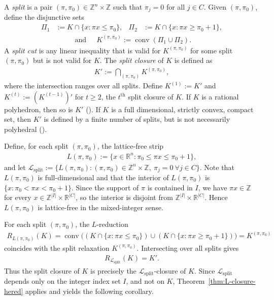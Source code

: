 \documentclass{article}
\newcommand{\Z}{\mathbb{Z}}
\newcommand{\R}{\mathbb{R}}
\renewcommand{\L}{\mathcal{L}}
\begin{document}
A \emph{split} is a pair $(\pi, \pi_0) \in \Z^n \times \Z$ such that $\pi_j = 0$ for all $j \in C$.
Given $(\pi, \pi_0)$, define the disjunctive sets
\begin{align}
    \Pi_1 &:= K \cap \{x : \pi x \leq \pi_0\}, &
    \Pi_2 &:= K \cap \{x : \pi x \geq \pi_0 + 1\}, 
\end{align}
\begin{align}
   \mbox{ and } \;\;\;\; K^{(\pi, \pi_0)} := \operatorname{conv}(\Pi_1 \cup \Pi_2).
\end{align}
A \emph{split cut} is any linear inequality that is valid for $K^{(\pi, \pi_0)}$ for some split $(\pi, \pi_0)$ but is not valid for $K$.
The \emph{split closure} of $K$ is defined as 
\begin{align}
    K' := \bigcap_{(\pi, \pi_0)} K^{(\pi, \pi_0)},
\end{align}
where the intersection ranges over all splits.
Define $K^{(1)} := K'$ and $K^{(t)} := (K^{(t-1)})'$ for $t \geq 2$, the $t^{\text{th}}$ split closure of $K$.
If $K$ is a rational polyhedron, then so is $K'$ (\cite{cook1990chvatal}). If $K$ is a full dimensional, strictly convex, compact set, then $K'$ is defined by a finite number of splits, but is not necessarily polyhedral (\cite{dadush2011split}).


Define, for each split $(\pi, \pi_0)$, the lattice-free strip
\begin{align}
    L(\pi, \pi_0) := \{x \in \R^n : \pi_0 \leq \pi x \leq \pi_0 + 1\},
\end{align}
and let $\L_{\mathrm{split}} := \{L(\pi, \pi_0) : (\pi, \pi_0) \in \Z^n \times \Z, \ \pi_j = 0 \ \forall j \in C\}$. Note that $L(\pi, \pi_0)$ is full-dimensional and that the interior of $L(\pi, \pi_0)$ is $\{x : \pi_0 < \pi x < \pi_0 + 1\}$. Since the support of $\pi$ is contained in $I$, we have $\pi x \in \Z$ for every $x \in \Z^{|I|} \times \R^{|C|}$, so the interior is disjoint from $\Z^{|I|} \times \R^{|C|}$. Hence $L(\pi, \pi_0)$ is lattice-free in the mixed-integer sense.

For each split $(\pi, \pi_0)$, the $L$-reduction
\begin{align}
    R_{L(\pi,\pi_0)}(K) = \operatorname{conv}\big( (K \cap \{x : \pi x \leq \pi_0\}) \cup (K \cap \{x : \pi x \geq \pi_0 + 1\}) \big) = K^{(\pi, \pi_0)}
\end{align}
coincides with the split relaxation $K^{(\pi, \pi_0)}$. Intersecting over all splits gives
\begin{align}
    R_{\L_{\mathrm{split}}}(K) = K'.
\end{align}
Thus the split closure of $K$ is precisely the $\L_{\mathrm{split}}$-closure of $K$. Since $\L_{\mathrm{split}}$ depends only on the integer index set $I$, and not on $K$, Theorem~\ref{thm:L-closure-hered} applies and yields the following corollary.
\end{document}
